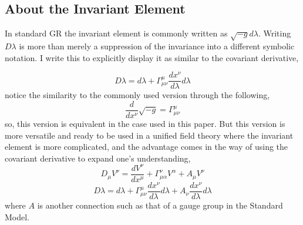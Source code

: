 \documentclass[aps,prd,preprint]{revtex4-1}
\begin{document}
\appendix

\begin{fleqn}

\section{About the Invariant Element}\label{app.invariant_element}
In standard GR the invariant element is commonly written as $\sqrt{-g}d\lambda$. Writing $D\lambda$ is more than merely a suppression of the invariance into a different symbolic notation. I write this to explicitly display it as similar to the covariant derivative,
        
\begin{equation*}
    D\lambda = d\lambda + \Gamma^{\mu}_{\mu\nu}\frac{dx^{\nu}}{d\lambda}d\lambda
\end{equation*}
notice the similarity to the commonly used version through the following,
\begin{equation*}
    \frac{d}{dx^\nu}\sqrt{-g} = \Gamma^{\mu}_{\mu\nu}
\end{equation*}
so, this version is equivalent in the case used in this paper. But this version is more versatile and ready to be used in a unified field theory where the invariant element is more complicated, and the advantage comes in the way of using the covariant derivative to expand one's understanding,
\begin{equation*}
    D_\mu V^\nu = \frac{dV^\nu }{dx^\mu} + \Gamma^{\nu}_{\mu\alpha}V^\alpha + A_\mu V^\nu
\end{equation*}
\begin{equation*}
    D\lambda = d\lambda + \Gamma^{\mu}_{\mu\nu}\frac{dx^{\nu}}{d\lambda}d\lambda + A_\nu \frac{dx^\nu}{d\lambda}d\lambda
\end{equation*}
where $A$ is another connection such as that of a gauge group in the Standard Model.


\end{fleqn}
\end{document}

